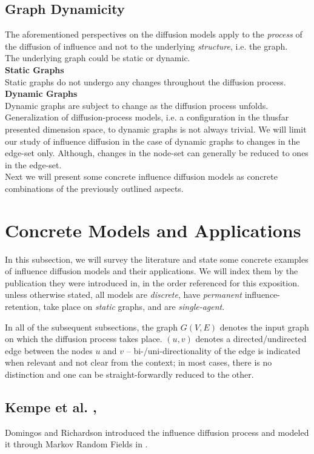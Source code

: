 \documentclass[twocolumn, 10pt]{article}
\begin{document}
\subsection{Graph Dynamicity}
The aforementioned perspectives on the diffusion models apply to the \textit{process} of the diffusion of influence and not to the underlying \textit{structure}, i.e. the graph. \\
The underlying graph could be static or dynamic.\\
\textbf{Static Graphs} \\
Static graphs do not undergo any changes throughout the diffusion process.
\textbf{Dynamic Graphs} \\
Dynamic graphs are subject to change as the diffusion process unfolds. Generalization of diffusion-process models, i.e. a configuration in the thusfar presented dimension space, to dynamic graphs is not always trivial. We will limit our study of influence diffusion in the case of dynamic graphs to changes in the edge-set only. Although, changes in the node-set can generally be reduced to ones in the edge-set. \\

Next we will present some concrete influence diffusion models as concrete combinations of the previously outlined aspects.

\section{Concrete Models and Applications}
In this subsection, we will survey the literature and state some concrete examples of influence diffusion models and their applications. We will index them by the publication they were introduced in, in the order referenced for this exposition. unless otherwise stated, all models are \textit{discrete}, have \textit{permanent} influence-retention, take place on \textit{static} graphs, and are \textit{single-agent}. 

In all of the subsequent subsections, the graph $G(V, E)$ denotes the input graph on which the diffusion process takes place. $(u, v)$ denotes a directed/undirected edge between the nodes $u$ and $v$ -- bi-/uni-directionality of the edge is indicated when relevant and not clear from the context; in most cases, there is no distinction and one can be straight-forwardly reduced to the other.
\subsection{Kempe et al. \cite{kempe}, \cite{kempe0}}
Domingos and Richardson introduced the influence diffusion process and modeled it through Markov Random Fields in \cite{dom}. 
\end{document}
